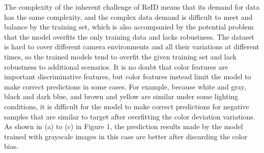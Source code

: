 \documentclass[10pt,twocolumn,letterpaper]{article}
\begin{document}
The complexity of the inherent challenge of ReID means that its demand for data has the same complexity, and the complex data demand is difficult to meet and balance by the training set, which is also accompanied by the potential problem that the model overfits the only training data and lacks robustness. The dataset is hard to cover different camera environments and all their variations at different times, so the trained models tend to overfit the given training set and lack robustness to additional scenarios. It is no doubt that color features are important discriminative features, but color features instead limit the model to make correct predictions in some cases. For example, because white and gray, black and dark blue, and brown and yellow are similar under some lighting conditions, it is difficult for the model to make correct predictions for negative samples that are similar to target after overfitting the color deviation variations. As shown in (a) to (c) in Figure 1, the prediction results made by the model trained with grayscale images in this case are better after discarding the color bias.
\end{document}
